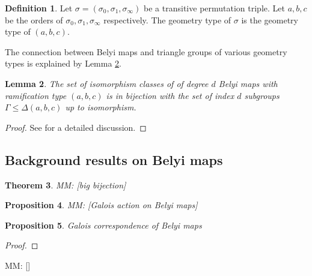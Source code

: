 \documentclass{dcthesis}
\newcommand{\defi}[1]{\textsf{#1}}
\newcommand{\mm}[1]{{\color{blue} \sf MM: [#1]}}
\newtheorem{prop}{Proposition}[section]
\newtheorem{theorem}[prop]{Theorem}
\newtheorem{lemma}[prop]{Lemma}
\theoremstyle{definition}
\newtheorem{definition}[prop]{Definition}
\theoremstyle{remark}
\numberwithin{equation}{section}
\numberwithin{figure}{section}
\begin{document}
{{{      \begin{definition}\label{def:geometrytypeofpermutationtriple}
        Let $\sigma=(\sigma_0,\sigma_1,\sigma_\infty)$ be a transitive permutation triple.
        Let $a,b,c$ be the orders of
        $\sigma_0,\sigma_1,\sigma_\infty$ respectively.
        The \defi{geometry type} of $\sigma$
        is the geometry type of $(a,b,c)$.
      \end{definition}
      The connection between Belyi maps and triangle groups
      of various geometry types is explained by Lemma
      \ref{lem:belyimapsandtrianglegroups}.
      \begin{lemma}
        \label{lem:belyimapsandtrianglegroups}
        The set of isomorphism classes of of degree $d$
        Belyi maps with ramification type $(a,b,c)$
        is in bijection with the set of
        index $d$ subgroups
        $\Gamma\leq\Delta(a,b,c)$
        up to isomorphism.
      \end{lemma}
      \begin{proof}
        See \cite{KMSV} for a detailed discussion.
      \end{proof}
    }
    \subsection{Background results on Belyi maps}{\label{subsec:backgroundresults}
      \begin{theorem}\label{thm:bigbijection}
        \mm{big bijection}
      \end{theorem}
      \begin{prop}\label{prop:galoisaction}
        \mm{Galois action on Belyi maps}
      \end{prop}
      \begin{prop}\label{prop:galoiscorrespondence}
        Galois correspondence of Belyi maps
      \end{prop}
      \begin{proof}
      \end{proof}
      \mm{\cite[1.6, 1.7]{SV}}
    }
}}
\end{document}
